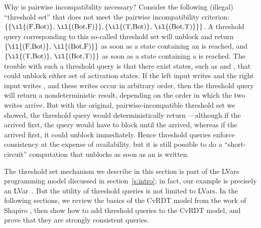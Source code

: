 Why is pairwise incompatibility necessary?  Consider the following
(illegal) ``threshold set'' that does not meet the pairwise
incompatibility criterion:
$ \{ \{ \textrm{\il{(F,Bot)}, \il{(Bot,F)}} \},  \{ \textrm{\il{(T,Bot)}, \il{(Bot,T)}} \} \} $.
A threshold query corresponding to this so-called threshold set will
unblock and return $\{ \textrm{\il{(F,Bot)}, \il{(Bot,F)}} \}$
as soon as a state containing an
 is reached, and $\{ \textrm{\il{(T,Bot)}, \il{(Bot,T)}} \}$
as soon as a state
containing a  is reached.  The trouble with such a threshold
query is that there exist states, such as  and ,
that could unblock either set of activation states.  If the left input
writes  and the right input writes , and these writes
occur in arbitrary order, then the threshold query will return a
nondeterministic result, depending on the order in which the two
writes arrive.  But with the original, pairwise-incompatible threshold
set we showed, the threshold query would deterministically return
---although if the  arrived first, the query would
have to block until the  arrived, whereas if the  arrived
first, it could unblock immediately.  Hence threshold queries enforce
consistency at the expense of availability, but it is still possible
to do a ``short-circuit'' computation that unblocks as soon as an
 is written.

The threshold set mechanism we describe in this section is 
part of the LVars programming model discussed in
section~\ref{s:intro}; in fact, our  example is precisely an
LVar~\cite{effectzoo}.  But the utility of threshold queries
is not limited to LVars.  In
the following sections, we review the basics of the CvRDT model from the work of
Shapiro \etal, then show how to add threshold queries to the CvRDT
model, and prove that they are strongly
consistent queries.

